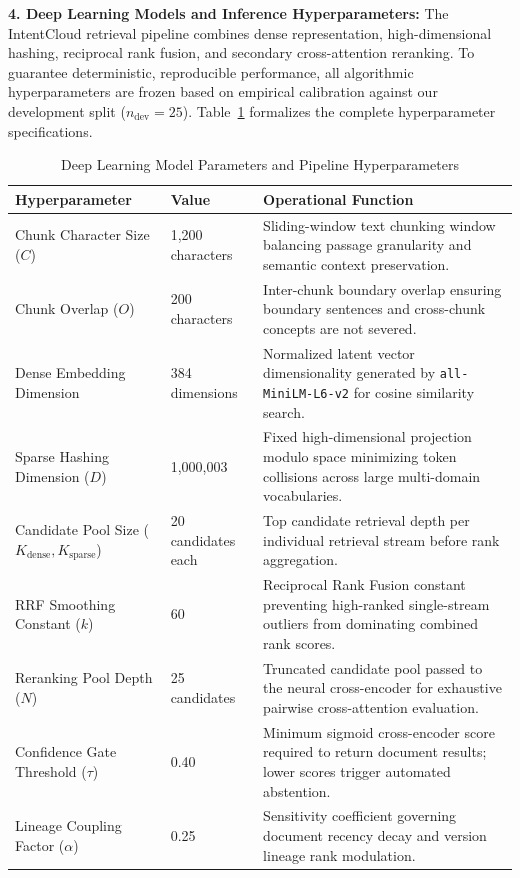 \documentclass[a4paper,12pt]{article}
\begin{document}
\vspace{0.8em}
\noindent\textbf{4. Deep Learning Models and Inference Hyperparameters:}
The IntentCloud retrieval pipeline combines dense representation, high-dimensional hashing, reciprocal rank fusion, and secondary cross-attention reranking. To guarantee deterministic, reproducible performance, all algorithmic hyperparameters are frozen based on empirical calibration against our development split ($n_{\text{dev}}=25$). Table~\ref{tab:hyperparameters} formalizes the complete hyperparameter specifications.

\begin{table}[H]
\centering
\small
\renewcommand{\arraystretch}{1.12}
\setlength{\tabcolsep}{5pt}
\begin{tabularx}{\textwidth}{|p{3.8cm}|p{2.8cm}|X|}
\hline
\rowcolor{gray!15} \textbf{Hyperparameter} & \textbf{Value} & \textbf{Operational Function} \\ \hline
Chunk Character Size ($C$) & 1,200 characters & Sliding-window text chunking window balancing passage granularity and semantic context preservation. \\ \hline
Chunk Overlap ($O$) & 200 characters & Inter-chunk boundary overlap ensuring boundary sentences and cross-chunk concepts are not severed. \\ \hline
Dense Embedding Dimension & 384 dimensions & Normalized latent vector dimensionality generated by \texttt{all-MiniLM-L6-v2} for cosine similarity search. \\ \hline
Sparse Hashing Dimension ($D$) & 1,000,003 & Fixed high-dimensional projection modulo space minimizing token collisions across large multi-domain vocabularies. \\ \hline
Candidate Pool Size ($K_{\text{dense}}, K_{\text{sparse}}$) & 20 candidates each & Top candidate retrieval depth per individual retrieval stream before rank aggregation. \\ \hline
RRF Smoothing Constant ($k$) & 60 & Reciprocal Rank Fusion constant preventing high-ranked single-stream outliers from dominating combined rank scores. \\ \hline
Reranking Pool Depth ($N$) & 25 candidates & Truncated candidate pool passed to the neural cross-encoder for exhaustive pairwise cross-attention evaluation. \\ \hline
Confidence Gate Threshold ($\tau$) & 0.40 & Minimum sigmoid cross-encoder score required to return document results; lower scores trigger automated abstention. \\ \hline
Lineage Coupling Factor ($\alpha$) & 0.25 & Sensitivity coefficient governing document recency decay and version lineage rank modulation. \\ \hline
\end{tabularx}
\vspace{-0.2em}
\caption{Deep Learning Model Parameters and Pipeline Hyperparameters}
\label{tab:hyperparameters}
\end{table}
\end{document}

